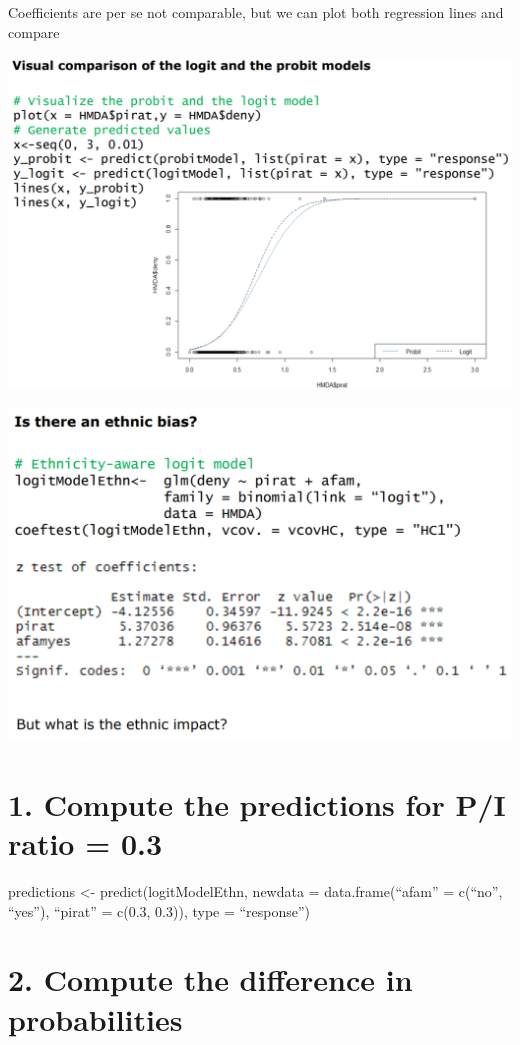 \documentclass[
]{article}
\begin{document}
Coefficients are per se not comparable, but we can plot both regression
lines and compare

\includegraphics[width=1\linewidth]{visi}

\includegraphics[width=1\linewidth]{ethic}

\hypertarget{compute-the-predictions-for-pi-ratio-0.3-1}{%
\section{1. Compute the predictions for P/I ratio =
0.3}\label{compute-the-predictions-for-pi-ratio-0.3-1}}

predictions \textless- predict(logitModelEthn, newdata =
data.frame(``afam'' = c(``no'', ``yes''), ``pirat'' = c(0.3, 0.3)), type
= ``response'')

\hypertarget{compute-the-difference-in-probabilities-1}{%
\section{2. Compute the difference in
probabilities}\label{compute-the-difference-in-probabilities-1}}
\end{document}
